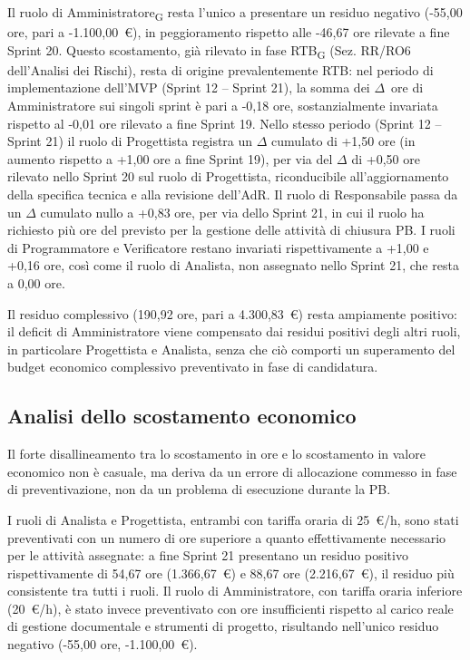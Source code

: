 Il ruolo di Amministratore\textsubscript{G} resta l'unico a presentare un
residuo negativo (-55,00 ore, pari a -1.100,00~\euro), in peggioramento
rispetto alle -46,67 ore rilevate a fine Sprint 20. Questo scostamento,
già rilevato in fase RTB\textsubscript{G} (Sez. RR/RO6 dell'Analisi dei
Rischi), resta di origine prevalentemente RTB: nel periodo di implementazione
dell'MVP (Sprint 12 -- Sprint 21), la somma dei $\Delta$~ore di
Amministratore sui singoli sprint è pari a -0,18 ore, sostanzialmente
invariata rispetto al -0,01 ore rilevato a fine Sprint 19.
Nello stesso periodo (Sprint 12 -- Sprint 21) il ruolo di Progettista
registra un $\Delta$ cumulato di +1,50 ore (in aumento rispetto a +1,00 ore
a fine Sprint 19), per via del $\Delta$ di +0,50 ore rilevato nello Sprint 20
sul ruolo di Progettista, riconducibile all'aggiornamento della specifica
tecnica e alla revisione dell'AdR. Il ruolo di Responsabile passa da un
$\Delta$ cumulato nullo a +0,83 ore, per via dello Sprint 21, in cui il
ruolo ha richiesto più ore del previsto per la gestione delle attività di
chiusura PB. I ruoli di Programmatore e Verificatore restano invariati
rispettivamente a +1,00 e +0,16 ore, così come il ruolo di Analista, non
assegnato nello Sprint 21, che resta a 0,00 ore.

Il residuo complessivo (190,92 ore, pari a 4.300,83~\euro) resta ampiamente
positivo: il deficit di Amministratore viene compensato dai residui positivi
degli altri ruoli, in particolare Progettista e Analista, senza che ciò
comporti un superamento del budget economico complessivo preventivato in fase
di candidatura.

\subsection{Analisi dello scostamento economico}

Il forte disallineamento tra lo scostamento in ore e lo scostamento in
valore economico non è casuale, ma deriva da un errore di allocazione
commesso in fase di preventivazione, non da un problema
di esecuzione durante la PB.

I ruoli di Analista e Progettista, entrambi con tariffa oraria di 25~\euro/h,
sono stati preventivati con un numero di ore superiore a quanto
effettivamente necessario per le attività assegnate: a fine Sprint 21
presentano un residuo positivo rispettivamente di 54,67 ore (1.366,67~\euro)
e 88,67 ore (2.216,67~\euro), il residuo più consistente tra tutti i ruoli.
Il ruolo di Amministratore, con tariffa oraria inferiore (20~\euro/h), è
stato invece preventivato con ore insufficienti rispetto al carico reale di
gestione documentale e strumenti di progetto, risultando nell'unico residuo
negativo (-55,00 ore, -1.100,00~\euro).

